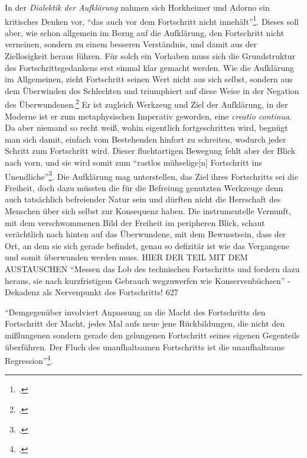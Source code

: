 \documentclass[a4paper, 12pt]{article}
\begin{document}
\begin{onehalfspace}
In der \emph{Dialektik der Aufklärung} nahmen sich Horkheimer und Adorno ein kritisches Denken vor, "`das auch vor dem Fortschritt nicht innehält"'\footnote{\Cite[Siehe][S. IX ("`Zur Neuausgabe"')]{dialektik-der-aufklaerung}.}. Dieses soll aber, wie schon allgemein im Bezug auf die Aufklärung, den Fortschritt nicht verneinen, sondern zu einem besseren Verständnis, und damit aus der Ziellosigkeit heraus führen. Für solch ein Vorhaben muss sich die Grundstruktur des Fortschrittsgedankens erst einmal klar gemacht werden. Wie die Aufklärung im Allgemeinen, zieht Fortschritt seinen Wert nicht aus sich selbst, sondern aus dem Überwinden des Schlechten und triumphiert auf diese Weise in der Negation des Überwundenen.\footnote{\Cite[Vgl.][S. 638]{fortschritt}.} Er ist zugleich Werkzeug und Ziel der Aufklärung, in der Moderne ist er zum metaphysischen Imperativ geworden, eine \emph{creatio continua}. Da aber niemand so recht weiß, wohin eigentlich fortgeschritten wird, begnügt man sich damit, einfach vom Bestehenden hinfort zu schreiten, wodurch jeder Schritt zum Fortschritt wird. Dieser fluchtartigen Bewegung fehlt aber der Blick nach vorn, und sie wird somit zum "`rastlos mühselige[n] Fortschritt ins Unendliche"'\footnote{\Cite[Siehe][S. 32]{dialektik-der-aufklaerung}.}. Die Aufklärung mag unterstellen, das Ziel ihres Fortschritts sei die Freiheit, doch dazu müssten die für die Befreiung genutzten Werkzeuge denn auch tatsächlich befreiender Natur sein und dürften nicht die Herrschaft des Menschen über sich selbst zur Konsequenz haben. Die instrumentelle Vernunft, mit dem verschwommenen Bild der Freiheit im peripheren Blick, schaut verächtlich nach hinten auf das Überwundene, mit dem Bewusstsein, dass der Ort, an dem sie sich gerade befindet, genau so defizitär ist wie das Vergangene und somit überwunden werden muss. HIER DER TEIL MIT DEM AUSTAUSCHEN “Messen das Lob des technischen Fortschritts und fordern dazu heraus, sie nach kurzfristigem Gebrauch wegzuwerfen wie Konservenbüchsen” - Dekadenz als Nervenpunkt des Fortschritts! 627


"`Demgegenüber involviert Anpassung an die Macht des Fortschritts den Fortschritt der Macht, jedes Mal aufs neue jene Rückbildungen, die nicht den mißlungenen sondern gerade den gelungenen Fortschritt seines eigenen Gegenteils überführen. Der Fluch des unaufhaltsamen Fortschritts ist die unaufhaltsame Regression"'\footnote{\Cite[Siehe][S. 42]{dialektik-der-aufklaerung}.}.



\end{onehalfspace}
\end{document}
